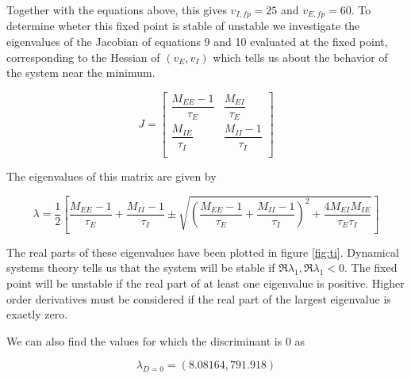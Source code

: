 \documentclass{article}
\begin{document}
Together with the equations above, this gives $v_{I,fp} = 25$ and $v_{E,fp} = 60$. To determine wheter this fixed point is stable of unstable we investigate the eigenvalues of the Jacobian of equations 9 and 10 evaluated at the fixed point, corresponding to the Hessian of $(v_E, v_I)$ which tells us about the behavior of the system near the minimum.

\[
J = 
\begin{bmatrix}
   \dfrac{M_{EE}-1}{\tau_E} &  \dfrac{M_{EI}}{\tau_E} \\
     \dfrac{M_{IE}}{\tau_I} & \dfrac{M_{II}-1}{\tau_I} \\
\end{bmatrix}
\]

The eigenvalues of this matrix are given by

\begin{equation}
\lambda = \dfrac{1}{2}[\dfrac{M_{EE}-1}{\tau_E}+\dfrac{M_{II}-1}{\tau_I} \pm \sqrt{(\dfrac{M_{EE}-1}{\tau_E}+\dfrac{M_{II}-1}{\tau_I})^2 + \dfrac{4M_{EI}M_{IE}}{\tau_E \tau_I}}]
\end{equation}

The real parts of these eigenvalues have been plotted in figure \ref{fig:ti}. Dynamical systems theory tells us that the system will be stable if $\Re{\lambda_1}, \Re{\lambda_1} < 0$. The fixed point will be unstable if the real part of at least one eigenvalue is positive. Higher order derivatives must be considered if the real part of the largest eigenvalue is exactly zero.
%
%
%
%

We can also find the values for which the discriminant is 0 as

\begin{equation}
\lambda_{D=0} = (8.08164, 791.918)
\end{equation}
\end{document}
